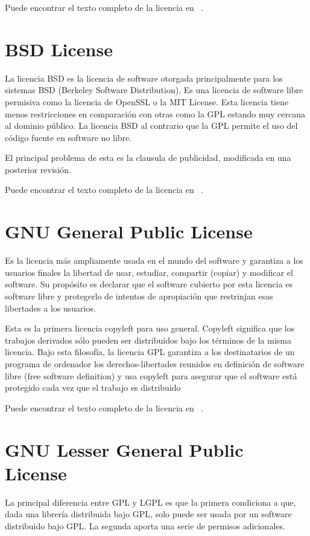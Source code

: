 Puede encontrar el texto completo de la licencia en ~\cite{MPL:mpl}.

\section{BSD License}

La licencia BSD es la licencia de software otorgada principalmente para los sistemas BSD (Berkeley Software Distribution). Es una licencia de software libre permisiva como la licencia de OpenSSL o la MIT License. Esta licencia tiene menos restricciones en comparación con otras como la GPL estando muy cercana al dominio público. La licencia BSD al contrario que la GPL permite el uso del código fuente en software no libre.

El principal problema de esta es la clausula de publicidad, modificada en una posterior revisión.

Puede encontrar el texto completo de la licencia en ~\cite{BSD:bsd}.

\section{GNU General Public License}

Es la licencia más ampliamente usada en el mundo del software y garantiza a los usuarios finales la libertad de usar, estudiar, compartir (copiar) y modificar el software. Su propósito es declarar que el software cubierto por esta licencia es software libre y protegerlo de intentos de apropiación que restrinjan esas libertades a los usuarios. 

Esta es la primera licencia copyleft para uso general. Copyleft significa que los trabajos derivados sólo pueden ser distribuidos bajo los términos de la misma licencia. Bajo esta filosofía, la licencia GPL garantiza a los destinatarios de un programa de ordenador los derechos-libertades reunidos en definición de software libre (free software definition) y usa copyleft para asegurar que el software está protegido cada vez que el trabajo es distribuido


Puede encontrar el texto completo de la licencia en ~\cite{GPL:gpl}.



\section{GNU Lesser General Public License} 
La principal diferencia entre GPL y LGPL es que la primera condiciona a que, dada una librería distribuida bajo GPL, solo puede ser usada por un software distribuido bajo GPL. La segunda aporta una serie de permisos adicionales.

